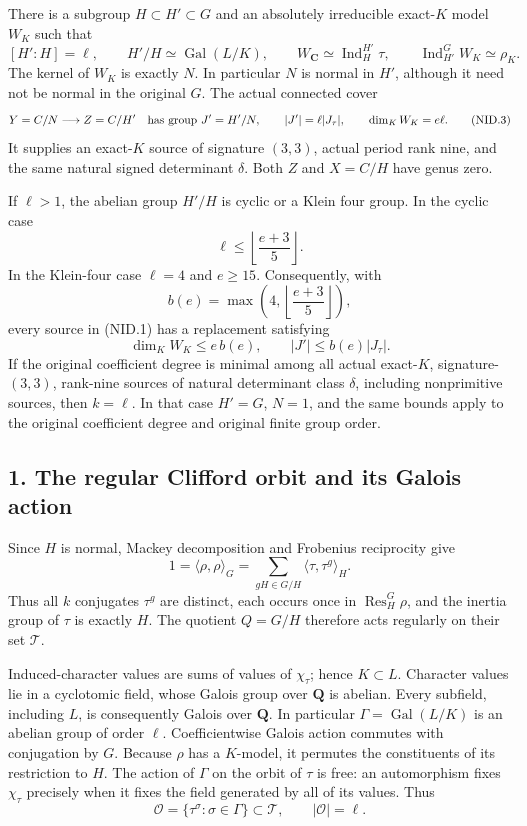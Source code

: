 \begin{theorem}
There is a subgroup $H\subset H'\subset G$ and an absolutely
irreducible exact-$K$ model $W_K$ such that
\[
 [H':H]=\ell,\qquad H'/H\simeq\operatorname{Gal}(L/K),
 \qquad W_{\mathbf C}\simeq\operatorname{Ind}_H^{H'}\tau,
 \qquad \operatorname{Ind}_{H'}^G W_K\simeq\rho_K.
 \tag{NID.2}
\]
The kernel of $W_K$ is exactly $N$.  In particular $N$ is normal in
$H'$, although it need not be normal in the original $G$.
The actual connected cover
\[
 Y=C/N\longrightarrow Z=C/H'
 \quad\hbox{has group }J'=H'/N,
 \qquad |J'|=\ell|J_\tau|,\qquad \dim_K W_K=e\ell.
 \tag{NID.3}
\]
It supplies an exact-$K$ source of signature $(3,3)$, actual period
rank nine, and the same natural signed determinant $\delta$.
Both $Z$ and $X=C/H$ have genus zero.

If $\ell>1$, the abelian group $H'/H$ is cyclic or a Klein four
group.  In the cyclic case
\[
       \ell\le\left\lfloor\frac{e+3}{5}\right\rfloor.
 \tag{NID.4}
\]
In the Klein-four case $\ell=4$ and $e\ge15$.  Consequently, with
\[
 b(e)=\max\left(4,\left\lfloor\frac{e+3}{5}\right\rfloor\right),
 \tag{NID.5}
\]
every source in (NID.1) has a replacement satisfying
\[
       \dim_K W_K\le e\,b(e),\qquad |J'|\le b(e)|J_\tau|.
 \tag{NID.6}
\]
If the original coefficient degree is minimal among all actual
exact-$K$, signature-$(3,3)$, rank-nine sources of natural determinant
class $\delta$, including nonprimitive sources, then $k=\ell$.
In that case $H'=G$, $N=1$, and the same bounds apply to the original
coefficient degree and original finite group order.
\end{theorem}

\subsection*{1. The regular Clifford orbit and its Galois action}

Since $H$ is normal, Mackey decomposition and Frobenius reciprocity give
\[
 1=\langle\rho,\rho\rangle_G
  =\sum_{gH\in G/H}\langle\tau,\tau^g\rangle_H.
 \tag{NID.7}
\]
Thus all $k$ conjugates $\tau^g$ are distinct, each occurs once in
$\operatorname{Res}_H^G\rho$, and the inertia group of $\tau$ is
exactly $H$.  The quotient $Q=G/H$ therefore acts regularly on their
set $\mathcal T$.

Induced-character values are sums of values of $\chi_\tau$; hence
$K\subset L$.  Character values lie in a cyclotomic field, whose
Galois group over $\mathbf Q$ is abelian.  Every subfield, including
$L$, is consequently Galois over $\mathbf Q$.  In particular
$\Gamma=\operatorname{Gal}(L/K)$ is an abelian group of order $\ell$.
Coefficientwise Galois action commutes with conjugation by $G$.
Because $\rho$ has a $K$-model, it permutes the constituents of its
restriction to $H$.  The action of $\Gamma$ on the orbit of $\tau$
is free: an automorphism fixes $\chi_\tau$ precisely when it fixes
the field generated by all of its values.  Thus
\[
        \mathcal O=\{\tau^\sigma:\sigma\in\Gamma\}
        \subset\mathcal T,\qquad |\mathcal O|=\ell.
 \tag{NID.8}
\]

